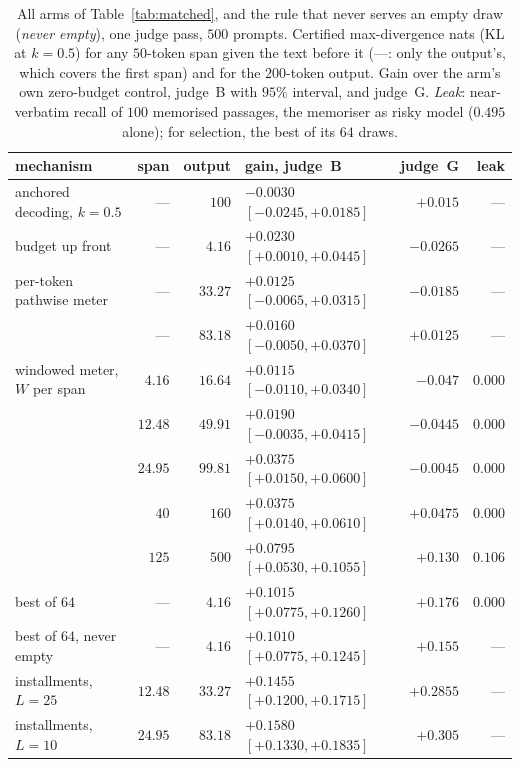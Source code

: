 \begin{table}[ht]
\centering\footnotesize
\caption{All arms of Table~\ref{tab:matched}, and the rule that never serves an empty draw (\emph{never empty}), one judge pass, $500$ prompts. Certified
max-divergence nats (KL at $k=0.5$) for any $50$-token span given the text before it (---: only the
output's, which covers the first span) and for the $200$-token output. Gain over the arm's own zero-budget
control, judge~B with $95\%$ interval, and judge~G. \emph{Leak}: near-verbatim recall of $100$ memorised
passages, the memoriser as risky model ($0.495$ alone); for selection, the best of its $64$ draws.}
\label{tab:matchedfull}
\setlength{\tabcolsep}{4pt}
\begin{tabular}{@{}lrrlrr@{}}
\toprule
mechanism & span & output & gain, judge~B & judge~G & leak \\
\midrule
anchored decoding, $k=0.5$ & --- & $100$ & $-0.0030$ $[-0.0245, +0.0185]$ & $+0.015$ & --- \\
budget up front & --- & $4.16$ & $+0.0230$ $[+0.0010, +0.0445]$ & $-0.0265$ & --- \\
per-token pathwise meter & --- & $33.27$ & $+0.0125$ $[-0.0065, +0.0315]$ & $-0.0185$ & --- \\
 & --- & $83.18$ & $+0.0160$ $[-0.0050, +0.0370]$ & $+0.0125$ & --- \\
windowed meter, $W$ per span & $4.16$ & $16.64$ & $+0.0115$ $[-0.0110, +0.0340]$ & $-0.047$ & $0.000$ \\
 & $12.48$ & $49.91$ & $+0.0190$ $[-0.0035, +0.0415]$ & $-0.0445$ & $0.000$ \\
 & $24.95$ & $99.81$ & $+0.0375$ $[+0.0150, +0.0600]$ & $-0.0045$ & $0.000$ \\
 & $40$ & $160$ & $+0.0375$ $[+0.0140, +0.0610]$ & $+0.0475$ & $0.000$ \\
 & $125$ & $500$ & $+0.0795$ $[+0.0530, +0.1055]$ & $+0.130$ & $0.106$ \\
\midrule
best of $64$ & --- & $4.16$ & $+0.1015$ $[+0.0775, +0.1260]$ & $+0.176$ & $0.000$ \\
best of $64$, never empty & --- & $4.16$ & $+0.1010$ $[+0.0775, +0.1245]$ & $+0.155$ & --- \\
installments, $L=25$ & $12.48$ & $33.27$ & $+0.1455$ $[+0.1200, +0.1715]$ & $+0.2855$ & --- \\
installments, $L=10$ & $24.95$ & $83.18$ & $+0.1580$ $[+0.1330, +0.1835]$ & $+0.305$ & --- \\
\bottomrule
\end{tabular}
\end{table}

